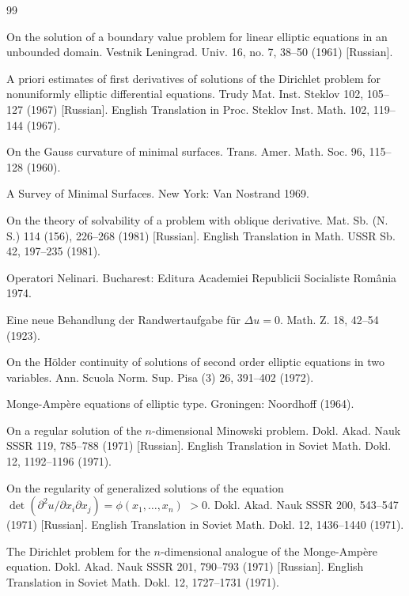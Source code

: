 \begin{thebibliography}{99}

On the solution of a boundary value problem for linear elliptic equations in an unbounded domain. Vestnik Leningrad. Univ. 16, no. 7, 38--50 (1961) [Russian].

A priori estimates of first derivatives of solutions of the Dirichlet problem for nonuniformly elliptic differential equations. Trudy Mat. Inst. Steklov 102, 105--127 (1967) [Russian]. English Translation in Proc. Steklov Inst. Math. 102, 119--144 (1967).

On the Gauss curvature of minimal surfaces. Trans. Amer. Math. Soc. 96, 115--128 (1960).

A Survey of Minimal Surfaces. New York: Van Nostrand 1969.

On the theory of solvability of a problem with oblique derivative. Mat. Sb. (N. S.) 114 (156), 226--268 (1981) [Russian]. English Translation in Math. USSR Sb. 42, 197--235 (1981).

Operatori Nelinari. Bucharest: Editura Academiei Republicii Socialiste România 1974.

Eine neue Behandlung der Randwertaufgabe für $\Delta u = 0$. Math. Z. 18, 42--54 (1923).

On the Hölder continuity of solutions of second order elliptic equations in two variables. Ann. Scuola Norm. Sup. Pisa (3) 26, 391--402 (1972).

Monge-Ampère equations of elliptic type. Groningen: Noordhoff (1964).

On a regular solution of the $n$-dimensional Minowski problem. Dokl. Akad. Nauk SSSR 119, 785--788 (1971) [Russian]. English Translation in Soviet Math. Dokl. 12, 1192--1196 (1971).

On the regularity of generalized solutions of the equation $\det(\partial^2 u/\partial x_i\partial x_j)=\phi(x_1,\dots,x_n)$ $> 0$. Dokl. Akad. Nauk SSSR 200, 543--547 (1971) [Russian]. English Translation in Soviet Math. Dokl. 12, 1436--1440 (1971).

The Dirichlet problem for the $n$-dimensional analogue of the Monge-Ampère equation. Dokl. Akad. Nauk SSSR 201, 790--793 (1971) [Russian]. English Translation in Soviet Math. Dokl. 12, 1727--1731 (1971).


\end{thebibliography}
